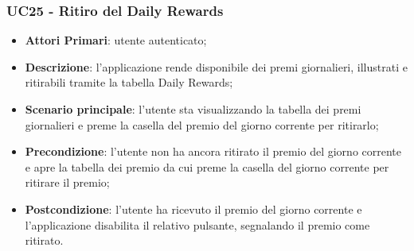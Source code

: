 \subsubsection{UC25 - Ritiro del Daily Rewards}
\begin{itemize}
	\item \textbf{Attori Primari}: utente autenticato;
	\item \textbf{Descrizione}: l'applicazione rende disponibile dei premi giornalieri, illustrati e ritirabili tramite la tabella Daily Rewards;
	\item \textbf{Scenario principale}: l'utente sta visualizzando la tabella dei premi giornalieri e preme la casella del premio del giorno corrente per ritirarlo;
	\item \textbf{Precondizione}: l'utente non ha ancora ritirato il premio del giorno corrente e apre la tabella dei premio da cui preme la casella del giorno corrente per ritirare il premio;
	\item \textbf{Postcondizione}: l'utente ha ricevuto il premio del giorno corrente e l'applicazione disabilita il relativo pulsante, segnalando il premio come ritirato. 
\end{itemize} 